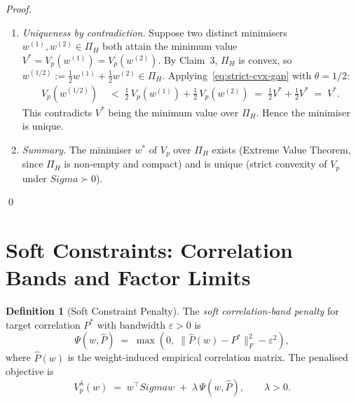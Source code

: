 \documentclass[12pt,openany]{book}
\newcommand{\bfw}{\mathbf{w}}
\newcommand{\bfSigma}{\boldsymbol{\Sigma}}
\numberwithin{equation}{chapter}
\theoremstyle{plain}
\theoremstyle{definition}
\newtheorem{definition}[theorem]{Definition}
\theoremstyle{remark}
\def\bfw{w}%
\def\bfSigma{Sigma}%
\begin{document}
\begin{proof}
\begin{enumerate}
\begin{enumerate}
    \item \textit{Uniqueness by contradiction.}
          Suppose two distinct minimisers
          $\bfw^{(1)}, \bfw^{(2)} \in \Pi_H$ both attain the minimum
          value $V^* = V_p(\bfw^{(1)}) = V_p(\bfw^{(2)})$.
          By Claim~3, $\Pi_H$ is convex, so
          $\bfw^{(1/2)} := \tfrac{1}{2}\bfw^{(1)}
          + \tfrac{1}{2}\bfw^{(2)} \in \Pi_H$.
          Applying~\eqref{eq:strict-cvx-gap} with $\theta = 1/2$:
          \begin{align}
            V_p\!\left(\bfw^{(1/2)}\right)
            &\;<\;
            \tfrac{1}{2}\,V_p(\bfw^{(1)})
            + \tfrac{1}{2}\,V_p(\bfw^{(2)})
            \;=\;
            \tfrac{1}{2}V^* + \tfrac{1}{2}V^*
            \;=\; V^*.
            \label{eq:contradiction}
          \end{align}
          This contradicts $V^*$ being the minimum value over $\Pi_H$.
          Hence the minimiser is unique.

    \item \textit{Summary.}
          The minimiser $\bfw^*$ of $V_p$ over $\Pi_H$ exists
          (Extreme Value Theorem, since $\Pi_H$ is non-empty and
          compact) and is unique (strict convexity of $V_p$ under
          $\bfSigma \succ 0$).
  \end{enumerate}

\end{enumerate}
\qed
\end{proof}

\section{Soft Constraints: Correlation Bands and Factor Limits}

\begin{definition}[Soft Constraint Penalty]
\label{def:soft-penalty}
The \emph{soft correlation-band penalty} for target correlation $P^*$
with bandwidth $\varepsilon > 0$ is
\begin{equation}
  \Psi(\bfw, \hat{P})
  \;=\;
  \max\!\left(0,\;
    \|\hat{P}(\bfw) - P^*\|_F^2 - \varepsilon^2
  \right),
  \label{eq:soft-penalty}
\end{equation}
where $\hat{P}(\bfw)$ is the weight-induced empirical correlation
matrix.  The penalised objective is
\begin{equation}
  V_p^{\lambda}(\bfw)
  \;=\;
  \bfw^\top\bfSigma\bfw
  \;+\;
  \lambda\,\Psi(\bfw, \hat{P}),
  \qquad \lambda > 0.
  \label{eq:penalised-obj}
\end{equation}
\end{definition}
\end{document}
